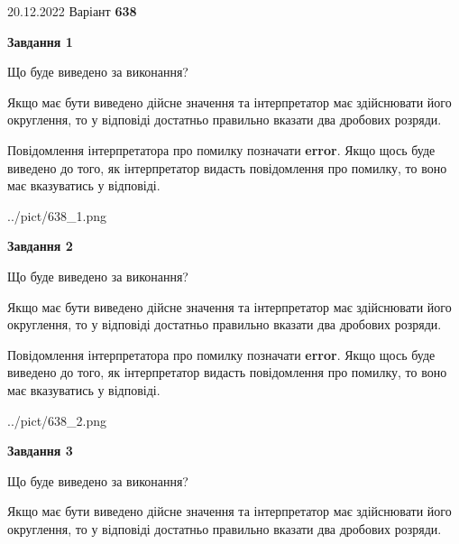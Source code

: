 \documentclass[12pt, ukrainian]{article}
\begin{document}
{20.12.2022 Варіант \No \textbf { 638 }\par}
{
\begin {Large}

{\begin {center}\textbf{Завдання 1}\end {center}}\par
Що буде виведено за виконання? \par

Якщо має бути виведено дійсне значення та інтерпретатор має здійснювати його округлення, 
то у відповіді достатньо правильно вказати два дробових розряди.

Повідомлення інтерпретатора про помилку позначати \textbf{error}.
Якщо щось буде виведено до того, як інтерпретатор видасть повідомлення про помилку, 
то воно має вказуватись у відповіді. \par

\begin{center}
	{../pict/638_1.png}
\end{center}
\newpage

{\begin {center}\textbf{Завдання 2}\end {center}}\par
Що буде виведено за виконання? \par

Якщо має бути виведено дійсне значення та інтерпретатор має здійснювати його округлення, 
то у відповіді достатньо правильно вказати два дробових розряди.

Повідомлення інтерпретатора про помилку позначати \textbf{error}.
Якщо щось буде виведено до того, як інтерпретатор видасть повідомлення про помилку, 
то воно має вказуватись у відповіді. \par

\begin{center}
	{../pict/638_2.png}
\end{center}
\newpage

{\begin {center}\textbf{Завдання 3}\end {center}}\par
Що буде виведено за виконання? \par

Якщо має бути виведено дійсне значення та інтерпретатор має здійснювати його округлення, 
то у відповіді достатньо правильно вказати два дробових розряди.


\end{Large}}
\end{document}

